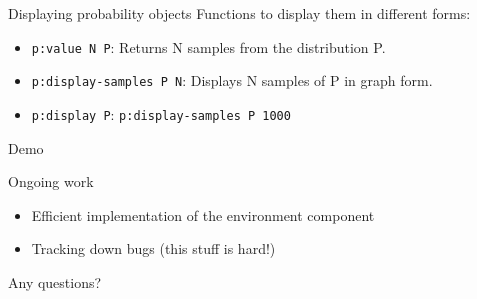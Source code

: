 \documentclass[14pt]{beamer}
\begin{document}
\begin{frame}{Displaying probability objects}
  Functions to display them in different forms:\\
  \begin{itemize}
    \item \texttt{p:value N P}: Returns N samples from the distribution P.
    \item \texttt{p:display-samples P N}: Displays N samples of P in graph form.
    \item \texttt{p:display P}: \texttt{p:display-samples P 1000}
  \end{itemize}
\end{frame}

\begin{frame}{Demo}
  
\end{frame}

\begin{frame}{Ongoing work}
  \begin{itemize}
  \item Efficient implementation of the environment component
  \item Tracking down bugs (this stuff is hard!)
  \end{itemize}
  \vfill
  Any questions?
\end{frame}
\end{document}
